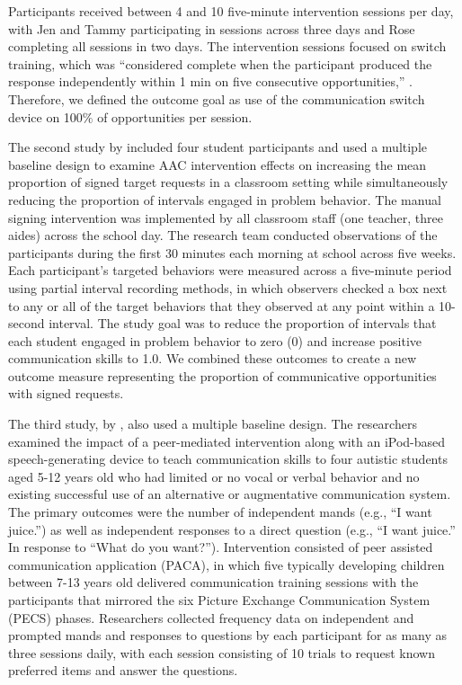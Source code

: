 \documentclass[
]{book}
\begin{document}
Participants received between 4 and 10 five-minute intervention sessions per day, with Jen and Tammy participating in sessions across three days and Rose completing all sessions in two days. The intervention sessions focused on switch training, which was ``considered complete when the participant produced the response independently within 1 min on five consecutive opportunities,'' \citep[p.~344]{Byiers2014}. Therefore, we defined the outcome goal as use of the communication switch device on 100\(\%\) of opportunities per session.

The second study by \citet{Casey1978} included four student participants and used a multiple baseline design to examine AAC intervention effects on increasing the mean proportion of signed target requests in a classroom setting while simultaneously reducing the proportion of intervals engaged in problem behavior. The manual signing intervention was implemented by all classroom staff (one teacher, three aides) across the school day. The research team conducted observations of the participants during the first 30 minutes each morning at school across five weeks. Each participant's targeted behaviors were measured across a five-minute period using partial interval recording methods, in which observers checked a box next to any or all of the target behaviors that they observed at any point within a 10-second interval. The study goal was to reduce the proportion of intervals that each student engaged in problem behavior to zero (0) and increase positive communication skills to 1.0. We combined these outcomes to create a new outcome measure representing the proportion of communicative opportunities with signed requests.

The third study, by \citet{StrasbergerFerreri2014}, also used a multiple baseline design. The researchers examined the impact of a peer-mediated intervention along with an iPod-based speech-generating device to teach communication skills to four autistic students aged 5-12 years old who had limited or no vocal or verbal behavior and no existing successful use of an alternative or augmentative communication system. The primary outcomes were the number of independent mands (e.g., ``I want juice.'') as well as independent responses to a direct question (e.g., ``I want juice.'' In response to ``What do you want?''). Intervention consisted of peer assisted communication application (PACA), in which five typically developing children between 7-13 years old delivered communication training sessions with the participants that mirrored the six Picture Exchange Communication System (PECS) phases. Researchers collected frequency data on independent and prompted mands and responses to questions by each participant for as many as three sessions daily, with each session consisting of 10 trials to request known preferred items and answer the questions.
\end{document}
